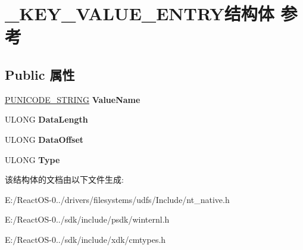 \hypertarget{struct___k_e_y___v_a_l_u_e___e_n_t_r_y}{}\section{\+\_\+\+K\+E\+Y\+\_\+\+V\+A\+L\+U\+E\+\_\+\+E\+N\+T\+R\+Y结构体 参考}
\label{struct___k_e_y___v_a_l_u_e___e_n_t_r_y}
\subsection*{Public 属性}
\begin{DoxyCompactItemize}
\item 
\mbox{\label{struct___k_e_y___v_a_l_u_e___e_n_t_r_y_a250cc45c8ef09ba45311f74f1ebb8f93}} 
\hyperlink{struct___u_n_i_c_o_d_e___s_t_r_i_n_g}{P\+U\+N\+I\+C\+O\+D\+E\+\_\+\+S\+T\+R\+I\+NG} {\bfseries Value\+Name}
\item 
\mbox{\label{struct___k_e_y___v_a_l_u_e___e_n_t_r_y_a3e956a1801eca5c9f3b0ccf163a6aa08}} 
U\+L\+O\+NG {\bfseries Data\+Length}
\item 
\mbox{\label{struct___k_e_y___v_a_l_u_e___e_n_t_r_y_a5ce6b901dbea556ba890ad5553f0cbaa}} 
U\+L\+O\+NG {\bfseries Data\+Offset}
\item 
\mbox{\label{struct___k_e_y___v_a_l_u_e___e_n_t_r_y_ad7873ecf4189636afd9045991c17af7c}} 
U\+L\+O\+NG {\bfseries Type}
\end{DoxyCompactItemize}


该结构体的文档由以下文件生成\+:\begin{DoxyCompactItemize}
\item 
E\+:/\+React\+O\+S-\/0../drivers/filesystems/udfs/\+Include/nt\+\_\+native.\+h\item 
E\+:/\+React\+O\+S-\/0../sdk/include/psdk/winternl.\+h\item 
E\+:/\+React\+O\+S-\/0../sdk/include/xdk/cmtypes.\+h\end{DoxyCompactItemize}
